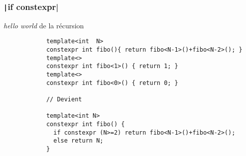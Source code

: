 \documentclass[C++.tex]{subfiles}
\begin{document}
\begin{frame}[fragile]
	\frametitle{\texttt|if constexpr|}
	\begin{block}{\textit{hello world} de la récursion}
		\begin{verbatim}
			template<int  N>
			constexpr int fibo(){ return fibo<N-1>()+fibo<N-2>(); }
			template<>
			constexpr int fibo<1>() { return 1; }
			template<>
			constexpr int fibo<0>() { return 0; }

			// Devient

			template<int N>
			constexpr int fibo() {
			  if constexpr (N>=2) return fibo<N-1>()+fibo<N-2>();
			  else return N;
			}
		\end{verbatim}
	\end{block}

\end{frame}
\end{document}
